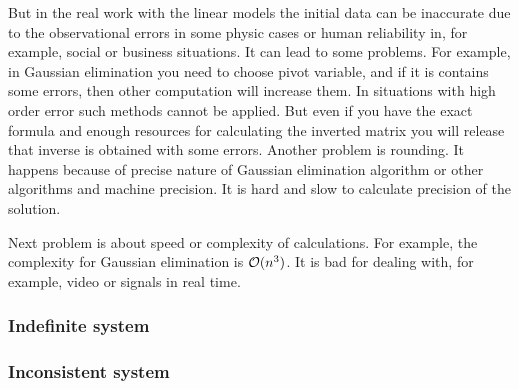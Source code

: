    \par
    But in the real work with the linear models the initial data can be inaccurate due to the observational errors in some physic cases or human reliability in, for example, social or business situations. It can lead to some problems. For example, in Gaussian elimination you need to choose pivot variable, and if it is contains some errors, then other computation will increase them. In situations with high order error such methods cannot be applied. But even if you have the exact formula and enough resources for calculating the inverted matrix you will release that inverse is obtained with some errors. Another problem is rounding. It happens because of precise nature of Gaussian elimination algorithm or other algorithms and machine precision. It is hard and slow to calculate precision of the solution.
    \par
    Next problem is about speed or complexity of calculations. For example, the complexity for Gaussian elimination is ${\cal O}(n^3)$. It is bad for dealing with, for example, video or signals in real time. 
    \subsubsection*{Indefinite system}
    \subsubsection*{Inconsistent system}
